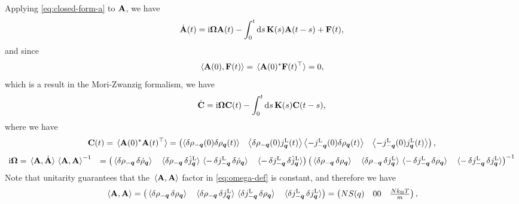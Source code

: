 \documentclass[hyperref, a4paper]{article}
\newcommand*{\ii}{\mathrm{i}}
\def\\{}%
\begin{document}
Applying \eqref{eq:closed-form-a} to $\vb{A}$, we have 
\[
    \dot{\vb{A}}(t)= \ii \vb{\Omega} \vb{A}(t) - \int_{0}^{t} \dd{s} \vb{K}(s) \vb{A}(t-s)+ \vb{F}(t),
\]
and since 
\[
    \expval*{\vb{A}(0), \vb{F}(t)} = \expval*{\vb{A}(0)^* \vb{F}(t)^\top} = 0, 
\]
which is a result in the Mori-Zwanzig formalism, we have 
\begin{equation}
    \dot{\vb{C}} = \ii \vb{\Omega} \vb{C}(t) - \int_{0}^{t} \dd{s} \vb{K}(s) \vb{C}(t-s),
    \label{eq:matrix-eq}
\end{equation}
where we have 
\begin{equation}
    \vb{C}(t) = \expval*{\vb{A}(0)^* \vb{A}(t)^\top} = \pmqty{\left\langle\delta \rho_{-\vb*{q}}(0) \delta \rho_{\vb*{q}}(t)\right\rangle & \left\langle\delta \rho_{-\vb*{q}}(0) j_{\vb*{q}}^\text{L}(t)\right\rangle \\
    \left\langle - j_{-\vb*{q}}^\text{L}(0) \delta \rho_{\vb*{q}}(t)\right\rangle & \left\langle - j_{-\vb*{q}}^\text{L}(0) j_{\vb*{q}}^\text{L}(t)\right\rangle},
    \label{eq:c-eq}
\end{equation}
\begin{equation}
    \begin{aligned}
        \ii \vb{\Omega} &= \expval*{\vb{A}, \dot{\vb{A}}} \expval*{\vb{A}, \vb{A}}^{-1} \\
        &= \pmqty{ 
            \expval*{\var{\rho_{-\vb*{q}}} \var{\dot{\rho}_{\vb*{q}}} } &
            \expval*{\var{\rho_{-\vb*{q}}} \var{\dot{j}^\text{L}_{\vb*{q}}} } \\
            \expval*{-\var{j^\text{L}_{-\vb*{q}}} \var{\dot{\rho}_{\vb*{q}}} } &
            \expval*{-\var{j^\text{L}_{-\vb*{q}}} \var{\dot{j}^\text{L}_{\vb*{q}}} }} 
        \pmqty{ 
            \expval*{\var{\rho_{-\vb*{q}}} \var{{\rho}_{\vb*{q}}} } &
            \expval*{\var{\rho_{-\vb*{q}}} \var{{j}^\text{L}_{\vb*{q}}} } \\
            \expval*{-\var{j^\text{L}_{-\vb*{q}}} \var{{\rho}_{\vb*{q}}} } &
            \expval*{-\var{j^\text{L}_{-\vb*{q}}} \var{{j}^\text{L}_{\vb*{q}}} } }^{-1}
    \end{aligned}
    \label{eq:omega-def}
\end{equation}
Note that unitarity guarantees that the $\expval*{\vb{A}, \vb{A}}$ factor in \eqref{eq:omega-def} is constant,
and therefore we have 
\begin{equation}
    \expval*{\vb{A}, \vb{A}} = \pmqty{ 
            \expval*{\var{\rho_{-\vb*{q}}} \var{{\rho}_{\vb*{q}}} } &
            \expval*{\var{\rho_{-\vb*{q}}} \var{{j}^\text{L}_{\vb*{q}}} } \\
            \expval*{\var{j^\text{L}_{-\vb*{q}}} \var{{\rho}_{\vb*{q}}} } &
            \expval*{\var{j^\text{L}_{-\vb*{q}}} \var{{j}^\text{L}_{\vb*{q}}} } 
        } = \pmqty{
            N S(q) & 0 \\ 
            0 &  \frac{N k_\text{B} T}{m}
        },
    \label{eq:normalize}
\end{equation}
\end{document}
